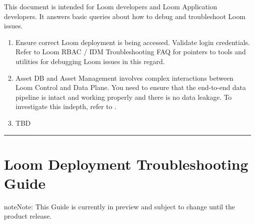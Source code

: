 \documentclass[letterpaper,10pt,english]{sphinxmanual}
\begin{document}
This document is intended for Loom developers and Loom Application developers. It answers basic queries about how to debug and troubleshoot Loom issues.
\begin{enumerate}
\item {} 
Ensure correct Loom deployment is being accessed.  Validate login credentials.  Refer to Loom RBAC / IDM Troubleshooting FAQ for pointers to tools and utilities for debugging Loom issues in this regard.

\item {} 
Asset DB and Asset Management involves complex interactions between Loom Control and Data Plane.  You need to ensure that the end-to-end data pipeline is intact and working properly and there is no data leakage.  To investigate this indepth, refer to .

\item {} 
TBD

\end{enumerate}


\bigskip\hrule\bigskip



\chapter{Loom Deployment Troubleshooting Guide}
\label{\detokenize{loom_trbs_faq:loom-deployment-troubleshooting-guide}}\label{\detokenize{loom_trbs_faq:trbs-loom-deployment}}
\begin{sphinxadmonition}{note}{Note:}
This Guide is currently in preview and subject to change until the product release.
\end{sphinxadmonition}



\renewcommand{\indexname}{Index}
\printindex
\end{document}

